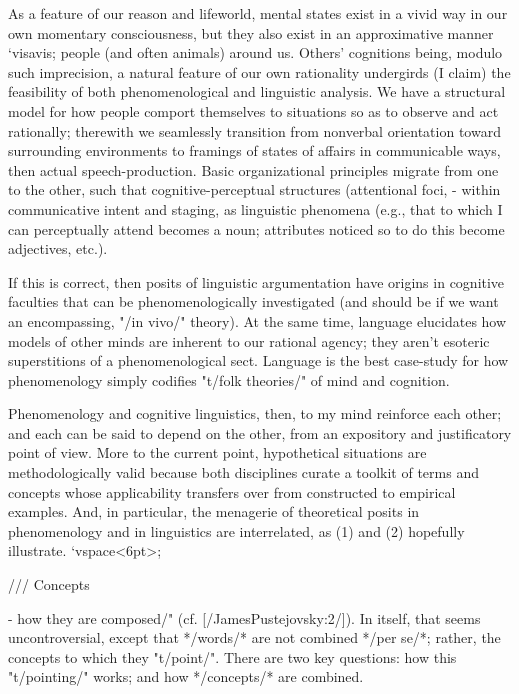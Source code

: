 As a feature of our 
reason and lifeworld, mental states exist 
in a vivid way in our own momentary consciousness, 
but they also exist in an approximative manner 
`visavis; people (and often animals) around us.  
Others' cognitions being, modulo such imprecision, 
a natural feature of our own rationality undergirds 
(I claim) the feasibility of both 
phenomenological and linguistic analysis.
We have a 
structural model for how people comport themselves 
to situations so as to observe and act rationally; 
therewith we seamlessly transition 
from nonverbal orientation toward surrounding 
environments to framings of states of affairs 
in communicable ways, then actual speech-production.  
Basic organizational principles migrate from one to 
the other, such that cognitive-perceptual structures 
(attentional foci, -%
within communicative intent and staging, as 
linguistic phenomena (e.g., that to which 
I can perceptually attend becomes a noun; attributes 
noticed so to do this become adjectives, etc.).

If this is correct, then posits of linguistic argumentation 
have origins in cognitive faculties that can be 
phenomenologically investigated (and should be if we 
want an encompassing, "/in vivo/" theory).  At the 
same time, language elucidates  
how models of other minds are inherent to our 
rational agency; they aren't esoteric superstitions 
of a phenomenological sect.  Language is the 
best case-study for how phenomenology simply 
codifies "t/folk theories/" of mind and cognition.  

Phenomenology and cognitive linguistics, then, to 
my mind reinforce each other; and each can be said 
to depend on the other, from an expository 
and justificatory point of view.  More to the current 
point, hypothetical situations are methodologically 
valid because both disciplines curate a 
toolkit of terms and concepts whose 
applicability transfers over from constructed 
to empirical examples.  And, in particular, the 
menagerie of theoretical posits in 
phenomenology and in linguistics are interrelated, 
as (1) and (2) hopefully illustrate. `vspace<6pt>;

///  Concepts

-%
how they are composed/" (cf. [/JamesPustejovsky:2/]).  In itself, that seems uncontroversial, 
except that */words/* are not combined */per se/*; rather, 
the concepts to which they "t/point/".  There are two 
key questions: how this "t/pointing/" works; and how 
*/concepts/* are combined.

